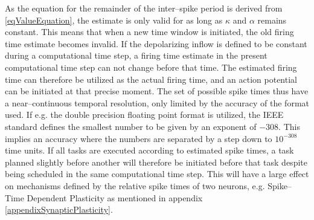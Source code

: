 	As the equation for the remainder of the inter--spike period is derived from \eqref{eqValueEquation}, the estimate is only valid for as long as $\kappa$ and $\alpha$ remains constant.
	This means that when a new time window is initiated, the old firing time estimate becomes invalid.
	If the depolarizing inflow is defined to be constant during a computational time step, a firing time estimate in the present computational time step can not change before that time. %
	The estimated firing time can therefore be utilized as the actual firing time, and an action potential can be initiated at that precise moment.
	The set of possible spike times thus have a near--continuous temporal resolution, only limited by the accuracy of the format used. %
	If e.g. the double precision floating point format is utilized, the IEEE standard defines the smallest number to be given by an exponent of $-308$\cite{kreyszig8edKAP17}. 
	This implies an accuracy where the numbers are separated by a step down to $10^{-308}$ time units.
	If all tasks are executed according to estimated spike times, a task planned slightly before another will therefore be initiated before that task despite being scheduled in the same computational time step.
	This will have a large effect on mechanisms defined by the relative spike times of two neurons, e.g. Spike--Time Dependent Plasticity as mentioned in appendix \ref{appendixSynapticPlasticity}.

